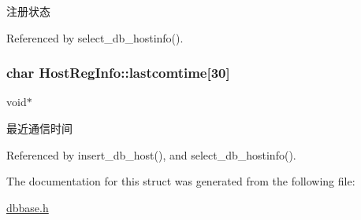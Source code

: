 注册状态 



Referenced by select\-\_\-db\-\_\-hostinfo().

\hypertarget{structHostRegInfo_a20b46c33f6aed2a9d4e11ae3f2ec2cee}{
\subsubsection[{lastcomtime}]{\setlength{\rightskip}{0pt plus 5cm}char Host\-Reg\-Info\-::lastcomtime\mbox{[}30\mbox{]}}}\label{structHostRegInfo_a20b46c33f6aed2a9d4e11ae3f2ec2cee}


void$\ast$ 

最近通信时间 

Referenced by insert\-\_\-db\-\_\-host(), and select\-\_\-db\-\_\-hostinfo().



The documentation for this struct was generated from the following file\-:\begin{DoxyCompactItemize}
\item 
\hyperlink{dbbase_8h}{dbbase.\-h}\end{DoxyCompactItemize}
